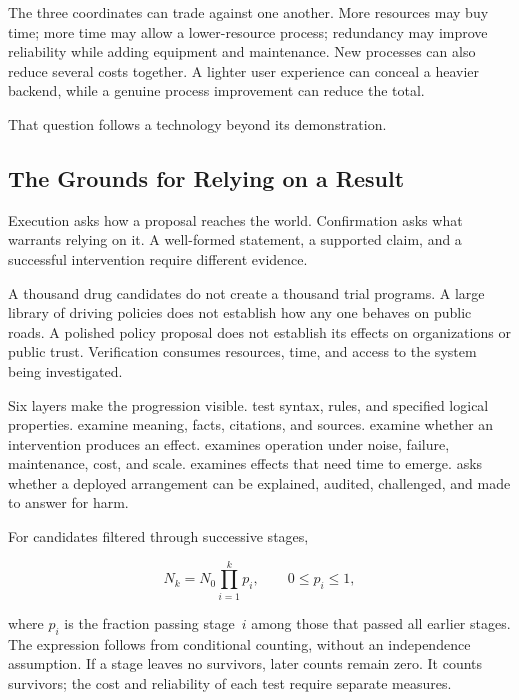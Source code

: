 The three coordinates can trade against one another. More resources may buy time; more time may allow a lower-resource process; redundancy may improve reliability while adding equipment and maintenance. New processes can also reduce several costs together. A lighter user experience can conceal a heavier backend, while a genuine process improvement can reduce the total.

 That question follows a technology beyond its demonstration.

\subsection{The Grounds for Relying on a Result}

Execution asks how a proposal reaches the world. Confirmation asks what warrants relying on it. A well-formed statement, a supported claim, and a successful intervention require different evidence.


A thousand drug candidates do not create a thousand trial programs. A large library of driving policies does not establish how any one behaves on public roads. A polished policy proposal does not establish its effects on organizations or public trust. Verification consumes resources, time, and access to the system being investigated.

Six layers make the progression visible.  test syntax, rules, and specified logical properties.  examine meaning, facts, citations, and sources.  examine whether an intervention produces an effect.  examines operation under noise, failure, maintenance, cost, and scale.  examines effects that need time to emerge.  asks whether a deployed arrangement can be explained, audited, challenged, and made to answer for harm.

For candidates filtered through successive stages,

\begin{equation}
N_k=N_0\prod_{i=1}^{k}p_i,
\qquad 0\leq p_i\leq1,
\end{equation}

where $p_i$ is the fraction passing stage~$i$ among those that passed all earlier stages. The expression follows from conditional counting, without an independence assumption. If a stage leaves no survivors, later counts remain zero. It counts survivors; the cost and reliability of each test require separate measures.

